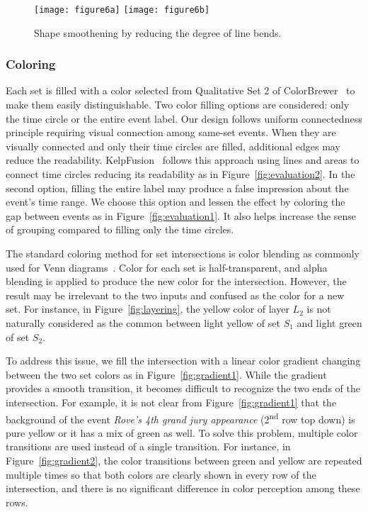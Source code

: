 \begin{figure}[ht]
	\centering
		{\texttt{[image: figure6a]}}\label{fig:generation1}
	\hfill
		{\texttt{[image: figure6b]}}\label{fig:generation2}
	\caption{Shape smoothening by reducing the degree of line bends.}
	\label{fig:generation}
\end{figure}

\subsubsection{Coloring}
Each set is filled with a color selected from Qualitative Set 2 of ColorBrewer~\cite{Harrower2003} to make them easily distinguishable. Two color filling options are considered: only the time circle or the entire event label. Our design follows uniform connectedness principle requiring visual connection among same-set events. When they are visually connected and only their time circles are filled, additional edges may reduce the readability. KelpFusion~\cite{Meulemans2013} follows this approach using lines and areas to connect time circles reducing its readability as in Figure~\ref{fig:evaluation2}. In the second option, filling the entire label may produce a false impression about the event's time range. We choose this option and lessen the effect by coloring the gap between events as in Figure~\ref{fig:evaluation1}. It also helps increase the sense of grouping compared to filling only the time circles.

The standard coloring method for set intersections is color blending as commonly used for Venn diagrams~\cite{Ware2013}. Color for each set is half-transparent, and alpha blending is applied to produce the new color for the intersection. However, the result may be irrelevant to the two inputs and confused as the color for a new set. For instance, in Figure~\ref{fig:layering}, the yellow color of layer $L_2$ is not naturally considered as the common between light yellow of set $S_1$ and light green of set $S_2$.

To address this issue, we fill the intersection with a linear color gradient changing between the two set colors as in Figure~\ref{fig:gradient1}. While the gradient provides a smooth transition, it becomes difficult to recognize the two ends of the intersection. For example, it is not clear from Figure~\ref{fig:gradient1} that the background of the event \textit{Rove's 4th grand jury appearance} (2\textsuperscript{nd} row top down) is pure yellow or it has a mix of green as well. To solve this problem, multiple color transitions are used instead of a single transition. For instance, in Figure~\ref{fig:gradient2}, the color transitions between green and yellow are repeated multiple times so that both colors are clearly shown in every row of the intersection, and there is no significant difference in color perception among these rows.

